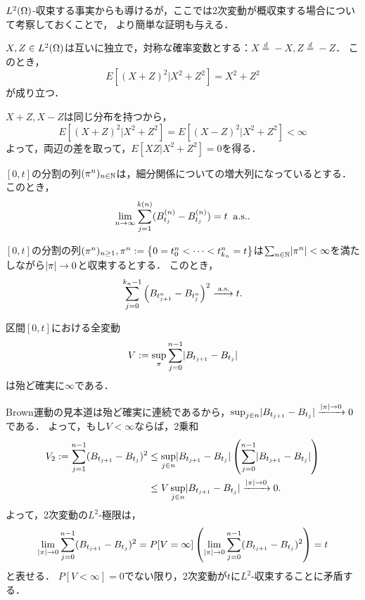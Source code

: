 \documentclass[uplatex,dvipdfmx]{jsreport}
\begin{document}
\begin{tcolorbox}[colframe=ForestGreen, colback=ForestGreen!10!white,breakable,colbacktitle=ForestGreen!40!white,coltitle=black,fonttitle=\bfseries\sffamily,
title=]
    $L^2(\Omega)$-収束する事実からも導けるが，ここでは2次変動が概収束する場合について考察しておくことで，
    より簡単な証明も与える．
\end{tcolorbox}

\begin{lemma}
    $X,Z\in L^2(\Omega)$は互いに独立で，対称な確率変数とする：$X\overset{d}{=}-X,Z\overset{d}{=}-Z$．
    このとき，
    \[E[(X+Z)^2|X^2+Z^2]=X^2+Z^2\]
    が成り立つ．
\end{lemma}
\begin{Proof}
    $X+Z,X-Z$は同じ分布を持つから，
    \[E[(X+Z)^2|X^2+Z^2]=E[(X-Z)^2|X^2+Z^2]<\infty\]
    よって，両辺の差を取って，$E[XZ|X^2+Z^2]=0$を得る．
\end{Proof}

\begin{proposition}[2次変動の概収束部分列]
    $[0,t]$の分割の列$(\pi^n)_{n\in\mathbb{N}}$は，細分関係についての増大列になっているとする．
    このとき，
    \[\lim_{n\to\infty}\sum^{k(n)}_{j=1}(B_{t_j}^{(n)}-B_{t_j}^{(n)})=t\;\;\mathrm{a.s.}.\]
\end{proposition}

\begin{proposition}[2次変動が概収束するための十分条件]
    $[0,t]$の分割の列$(\pi^n)_{n\ge 1},\pi^n:=\left\{0=t^n_0<\cdots<t^n_{k_n}=t\right\}$は$\sum_{n\in\mathbb{N}}\lvert\pi^n\rvert<\infty$を満たしながら$\lvert\pi\rvert\to0$と収束するとする．
    このとき，
    \[\sum^{k_n-1}_{j=0}\left(B_{t^n_{j+1}}-B_{t^n_j}\right)^2\xrightarrow{\;\mathrm{a.s.}}t.\]
\end{proposition}

\begin{corollary}[全変動の発散]
    区間$[0,t]$における全変動
    \[V:=\sup_{\pi}\sum^{n-1}_{j=0}\lvert B_{t_{j+1}}-B_{t_j}\rvert\]
    は殆ど確実に$\infty$である．
\end{corollary}
\begin{Proof}
    Brown運動の見本道は殆ど確実に連続であるから，$\sup_{j\in n}\lvert B_{t_{j+1}}-B_{t_j}\rvert\xrightarrow{\lvert\pi\rvert\to0}0$である．
    よって，もし$V<\infty$ならば，2乗和
    \begin{align*}
        V_2:=\sum^{n-1}_{j=1}(B_{t_{j+1}}-B_{t_j})^2&\le\sup_{j\in n}\lvert B_{t_{j+1}}-B_{t_j}\rvert\left(\sum^{n-1}_{j=0}\lvert B_{t_{j+1}}-B_{t_j}\rvert\right)\\
        &\le V\sup_{j\in n}\lvert B_{t_{j+1}}-B_{t_j}\rvert\xrightarrow{\lvert\pi\rvert\to0}0.
    \end{align*}
    よって，2次変動の$L^2$-極限は，
    \[\lim_{\lvert\pi\rvert\to0}\sum^{n-1}_{j=0}(B_{t_{j+1}}-B_{t_j})^2=P[V=\infty]\left(\lim_{\lvert\pi\rvert\to0}\sum^{n-1}_{j=0}(B_{t_{j+1}}-B_{t_j})^2\right)=t\]
    と表せる．
    $P[V<\infty]=0$でない限り，2次変動が$t$に$L^2$-収束することに矛盾する．
\end{Proof}
\end{document}
